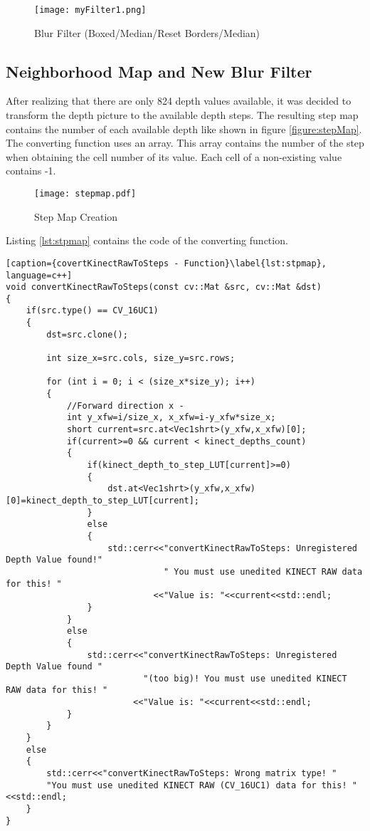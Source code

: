 \begin{figure}[htp]
\begin{center}
  \texttt{[image: myFilter1.png]}
  \caption{Blur Filter (Boxed/Median/Reset Borders/Median)}
  \label{figure:blur}
\end{center}
\end{figure}
\clearpage

\subsection{Neighborhood Map and New Blur Filter} \label{sect:blurFilter} 
After realizing that there are only 824 depth values available, it was decided to transform the depth picture
to the available depth steps. The resulting step map contains the number of each available depth like 
shown in figure \vref{figure:stepMap}. The converting function uses an array. This array contains the number of the
step when obtaining the cell number of its value. Each cell of a non-existing value contains -1. 

\begin{figure}[htp]
\begin{center}
  \texttt{[image: stepmap.pdf]}
  \caption{Step Map Creation}
  \label{figure:stepMap}
\end{center}
\end{figure}

Listing \vref{lst:stpmap} contains the code of the converting function.

\begin{lstlisting}[caption={covertKinectRawToSteps - Function}\label{lst:stpmap}, language=c++]
void convertKinectRawToSteps(const cv::Mat &src, cv::Mat &dst)
{
	if(src.type() == CV_16UC1)
	{
		dst=src.clone();

		int size_x=src.cols, size_y=src.rows;

		for (int i = 0; i < (size_x*size_y); i++)
		{
			//Forward direction x -
			int y_xfw=i/size_x, x_xfw=i-y_xfw*size_x;
			short current=src.at<Vec1shrt>(y_xfw,x_xfw)[0];
			if(current>=0 && current < kinect_depths_count)
			{
				if(kinect_depth_to_step_LUT[current]>=0)
				{
					dst.at<Vec1shrt>(y_xfw,x_xfw)[0]=kinect_depth_to_step_LUT[current];
				}
				else
				{
					std::cerr<<"convertKinectRawToSteps: Unregistered Depth Value found!" 
					           " You must use unedited KINECT RAW data for this! "
							 <<"Value is: "<<current<<std::endl;
				}
			}
			else
			{
				std::cerr<<"convertKinectRawToSteps: Unregistered Depth Value found " 
				           "(too big)! You must use unedited KINECT RAW data for this! "
						 <<"Value is: "<<current<<std::endl;
			}
		}
	}
	else
	{
		std::cerr<<"convertKinectRawToSteps: Wrong matrix type! "
		"You must use unedited KINECT RAW (CV_16UC1) data for this! "<<std::endl;
	}
}
\end{lstlisting}



